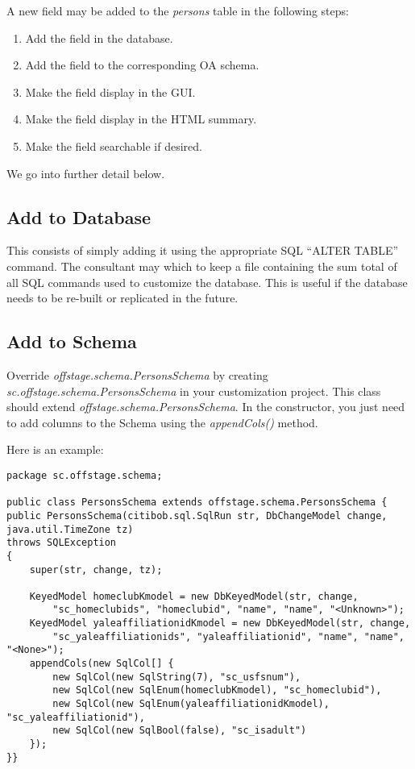 \documentclass[11pt]{article}
\begin{document}
A new field may be added to the \emph{persons} table in the following steps:
 \begin{enumerate}
 \item Add the field in the database.
 \item Add the field to the corresponding OA schema.
 \item Make the field display in the GUI.
 \item Make the field display in the HTML summary.
 \item Make the field searchable if desired.
 \end{enumerate}

We go into further detail below.

\subsection{Add to Database}

This consists of simply adding it using the appropriate SQL ``ALTER TABLE'' command.  The consultant may which to keep a file containing the sum total of all SQL commands used to customize the database.  This is useful if the database needs to be re-built or replicated in the future.

\subsection{Add to Schema}

Override \emph{offstage.schema.PersonsSchema} by creating \emph{sc.offstage.schema.PersonsSchema} in your customization project.  This class should extend \emph{offstage.schema.PersonsSchema}.  In the constructor, you just need to add columns to the Schema using the \emph{appendCols()} method.

Here is an example:
\begin{verbatim}
package sc.offstage.schema;

public class PersonsSchema extends offstage.schema.PersonsSchema {
public PersonsSchema(citibob.sql.SqlRun str, DbChangeModel change, java.util.TimeZone tz)
throws SQLException
{
	super(str, change, tz);
	
	KeyedModel homeclubKmodel = new DbKeyedModel(str, change,
		"sc_homeclubids", "homeclubid", "name", "name", "<Unknown>");
	KeyedModel yaleaffiliationidKmodel = new DbKeyedModel(str, change,
		"sc_yaleaffiliationids", "yaleaffiliationid", "name", "name", "<None>");
	appendCols(new SqlCol[] {
		new SqlCol(new SqlString(7), "sc_usfsnum"),
		new SqlCol(new SqlEnum(homeclubKmodel), "sc_homeclubid"),
		new SqlCol(new SqlEnum(yaleaffiliationidKmodel), "sc_yaleaffiliationid"),
		new SqlCol(new SqlBool(false), "sc_isadult")
	});
}}
\end{verbatim}
\end{document}
